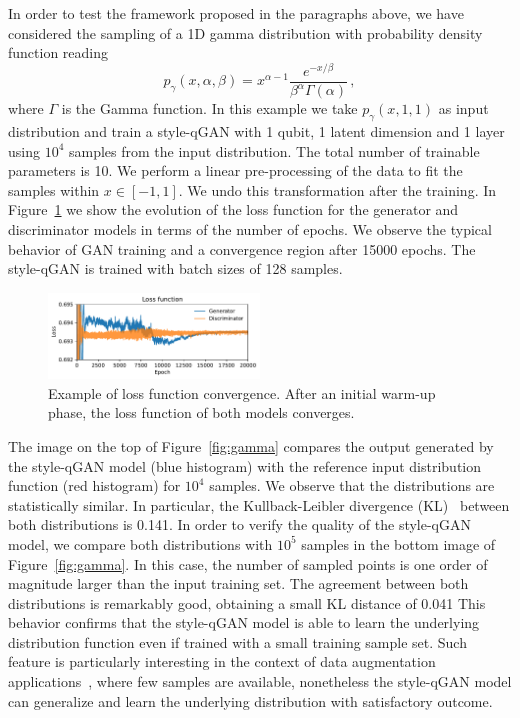\documentclass[twocolumn,preprintnumbers,superscriptaddress]{revtex4-2}
\begin{document}
In order to test the framework proposed in the paragraphs above, we have
considered the sampling of a 1D gamma distribution with probability density
function reading
\begin{equation}
  p_\gamma (x, \alpha, \beta) = x^{\alpha-1} \frac{e^{-x/\beta}}{\beta^\alpha \Gamma(\alpha)}\,,
\end{equation}
where $\Gamma$ is the Gamma function. In this example we take $p_\gamma (x, 1,
1)$ as input distribution and train a style-qGAN with 1 qubit, 1 latent dimension and
1 layer using $10^4$ samples from the input distribution. The total number of trainable parameters is 10. We perform a linear pre-processing of the data to fit the samples within $x \in [-1, 1]$. We undo this transformation after the training.
%
In Figure~\ref{fig:loss} we show the evolution of the loss function for the
generator and discriminator models in terms of the number of epochs. We observe the
typical behavior of GAN training and a convergence region after 15000 epochs.
%
The style-qGAN is trained with batch sizes of 128 samples.

\begin{figure}
  \includegraphics[width=0.5\textwidth]{plots/1Dgamma/1Dgamma_loss.pdf}
  \caption{\label{fig:loss}Example of loss function convergence. After an
  initial warm-up phase, the loss function of both models converges.}
\end{figure}

The image on the top of Figure~\ref{fig:gamma} compares the output generated by
the style-qGAN model (blue histogram) with the reference input distribution function
(red histogram) for $10^4$ samples. We observe that the distributions are
statistically similar. In particular, the Kullback-Leibler divergence
(KL)~\cite{kullback1951information} between both distributions is 0.141.
%
In order to verify the quality of the style-qGAN model, we compare both distributions
with $10^5$ samples in the bottom image of Figure~\ref{fig:gamma}. In this case,
the number of sampled points is one order of magnitude larger than the input
training set. The agreement between both distributions is remarkably good,
obtaining a small KL distance of 0.041
%
This behavior confirms that the style-qGAN model is able to learn the underlying
distribution function even if trained with a small training sample set. Such
feature is particularly interesting in the context of data augmentation
applications~\cite{frid2018synthetic,tanaka2019data}, where few samples are
available, nonetheless the style-qGAN model can generalize and learn the underlying distribution
with satisfactory outcome.
\end{document}
